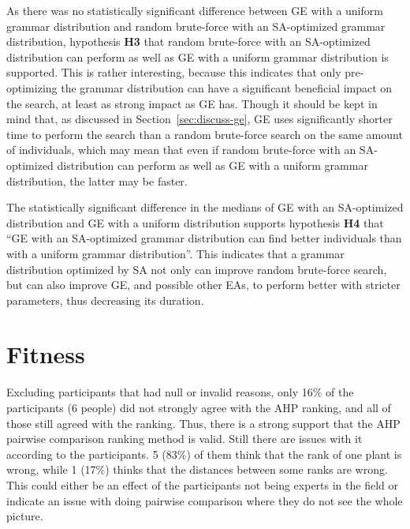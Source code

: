 As there was no statistically significant difference between \gls{GE} with a uniform grammar distribution and random brute-force with an \gls{SA}-optimized grammar distribution, hypothesis \textbf{H3} that random brute-force with an \gls{SA}-optimized distribution can perform as well as \gls{GE} with a uniform grammar distribution is supported.
This is rather interesting, because this indicates that only pre-optimizing the grammar distribution can have a significant beneficial impact on the search, at least as strong impact as \gls{GE} has.
Though it should be kept in mind that, as discussed in Section~\ref{sec:discuss-ge}, \gls{GE} uses significantly shorter time to perform the search than a random brute-force search on the same amount of individuals, which may mean that even if random brute-force with an \gls{SA}-optimized distribution can perform as well as \gls{GE} with a uniform grammar distribution, the latter may be faster.

The statistically significant difference in the medians of \gls{GE} with an \gls{SA}-optimized distribution and \gls{GE} with a uniform distribution supports hypothesis \textbf{H4} that ``GE with an SA-optimized grammar distribution can find better individuals than with a uniform grammar distribution''.
This indicates that a grammar distribution optimized by \gls{SA} not only can improve random brute-force search, but can also improve \gls{GE}, and possible other \glspl{EA}, to perform better with stricter parameters, thus decreasing its duration.


\section{Fitness}
Excluding participants that had null or invalid reasons, only 16\% of the participants (6 people) did not strongly agree with the \gls{AHP} ranking, and all of those still agreed with the ranking.
Thus, there is a strong support that the \gls{AHP} pairwise comparison ranking method is valid.
Still there are issues with it according to the participants.
5 (83\%) of them think that the rank of one plant is wrong, while 1 (17\%) thinks that the distances between some ranks are wrong.
This could either be an effect of the participants not being experts in the field or indicate an issue with doing pairwise comparison where they do not see the whole picture.

